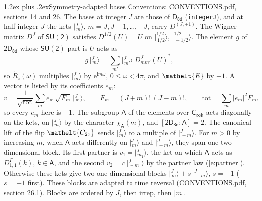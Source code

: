 \documentclass[10pt,a4paper]{article}
\makeatletter
\renewcommand\section{\@startsection{section}{1}{\z@}{-3ex plus -1ex minus -.2ex}%
  {1.2ex plus .2ex}{\normalfont\large\sffamily\bfseries\color{parttitle}}}
\numberwithin{equation}{section}
\newcommand{\eltfont}[1]{{\let\sigma\eltsigma\mathelt{#1}}}
\newcommand{\grp}[1]{\mathsf{#1}}
\newcommand{\elt}[1]{\eltfont{#1}}
\newcommand{\grpindex}[2]{[#1 : #2]}
\newcommand{\iunit}{\mathrm{i}}
\newcommand{\expe}{\mathrm{e}}
\newcommand{\irrJp}[2]{D^{(#1,#2)}}
\newcommand{\repD}[1]{D^{#1}}
\newcommand{\wignerD}[1]{D^{#1}}
\newcommand{\chiA}{\chi_{\grp{A}}}
\newcommand{\conj}[1]{{#1}^{*}}
\newcommand{\jm}[2]{\bigl\lvert{}^{#1}_{\,#2}\bigr\rangle}
\newcommand{\barred}[1]{\bar{#1}}
\newcommand{\lift}[1]{\tilde{#1}}
\makeatother
\begin{document}
\section{Symmetry-adapted bases}\label{s:bases}
Conventions: \href{../../CONVENTIONS.pdf}{CONVENTIONS.pdf}, sections \href{../../../rotation/CONVENTIONS.pdf\#conv.14}{14} and \href{../../CONVENTIONS.pdf\#conv.26}{26}.
\leavevmode\label{n:index.m}\label{n:vector.ket}The bases at integer $J$ are those of \href{../../../rotation/data/pdf/D8d.pdf}{$\grp{D_{8d}}$} (\texttt{integerJ}), and at half-integer $J$ the kets $\jm{J}{m}$, $m = J, J-1, \dots, -J$, carry $\irrJp{J}{+1}$. \label{n:matrix.wigner}The Wigner matrix $\wignerD{J}$ of $\grp{SU(2)}$ satisfies $\wignerD{1/2}(U) = U$ on $\jm{1/2}{1/2}$, $\jm{1/2}{-1/2}$. The element $g$ of $\grp{2D_{8d}}$ whose $\grp{SU(2)}$ part is $U$ acts as
\begin{equation}\label{e:action}g\,\jm{J}{m} = \sum_{m'} \jm{J}{m'}\; \conj{\wignerD{J}_{m m'}(U)},\end{equation}
so $\lift{R}_{z}(\omega)$ multiplies $\jm{J}{m}$ by $\expe^{\iunit m\omega}$, $0 \le \omega < 4\pi$, and $\elt{\barred{E}}$ by $-1$. \label{n:index.ketcoefficient}\label{n:vector.basis.symmetry}\label{n:index.ketweight}\label{n:index.total}A vector is listed by its coefficients $e_m$:
\begin{equation}\label{e:ket}v = \frac{1}{\sqrt{\mathrm{tot}}}\sum_m e_m\sqrt{F_m}\;\jm{J}{m},\qquad F_m = (J+m)!\,(J-m)!,\qquad \mathrm{tot} = \sum_m |e_m|^2F_m,\end{equation}
so every $e_m$ here is $\pm 1$.
\leavevmode\label{n:group.A}\label{n:function.character.abelian}The subgroup $\grp{A}$ of the elements over $\grp{C_{\infty h}}$ acts diagonally on the kets, on $\jm{J}{m}$ by the character $\chiA(m)$, and $\grpindex{\grp{2D_{8d}}}{\grp{A}} = 2$. The canonical lift of the flip $\elt{C_{2x}}$ sends $\jm{J}{m}$ to a multiple of $\jm{J}{-m}$. For $m > 0$ by increasing $m$, when $\grp{A}$ acts differently on $\jm{J}{m}$ and $\jm{J}{-m}$, they span one two-dimensional block. \label{n:index.partner.sign}Its first partner is $v_1 = \jm{J}{m_1}$, the ket on which $\grp{A}$ acts as $\repD{\Gamma}_{1,1}(k)$, $k \in \grp{A}$, and the second $v_2 = c\,\jm{J}{-m_1}$ by the partner law (\ref{e:partner}). \label{n:index.pair.sign}Otherwise these kets give two one-dimensional blocks $\jm{J}{m} + s\,\jm{J}{-m}$, $s = \pm 1$ ($s = +1$ first). These blocks are adapted to time reversal (\href{../../CONVENTIONS.pdf}{CONVENTIONS.pdf}, section \href{../../CONVENTIONS.pdf\#conv.26.1}{26.1}). Blocks are ordered by $J$, then irrep, then $|m|$.
\end{document}

